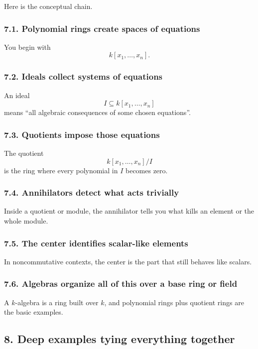 \documentclass[12pt,a4paper]{article}
\theoremstyle{plain}
\theoremstyle{definition}      %
\begin{document}
	Here is the conceptual chain.
	
	\subsubsection*{7.1. Polynomial rings create spaces of equations}
	
	You begin with
	\[
	k[x_1,\dots,x_n].
	\]
	
	\subsubsection*{7.2. Ideals collect systems of equations}
	
	An ideal
	\[
	I\subseteq k[x_1,\dots,x_n]
	\]
	means ``all algebraic consequences of some chosen equations''.
	
	\subsubsection*{7.3. Quotients impose those equations}
	
	The quotient
	\[
	k[x_1,\dots,x_n]/I
	\]
	is the ring where every polynomial in \(I\) becomes zero.
	
	\subsubsection*{7.4. Annihilators detect what acts trivially}
	
	Inside a quotient or module, the annihilator tells you what kills an element or the whole module.
	
	\subsubsection*{7.5. The center identifies scalar-like elements}
	
	In noncommutative contexts, the center is the part that still behaves like scalars.
	
	\subsubsection*{7.6. Algebras organize all of this over a base ring or field}
	
	A \(k\)-algebra is a ring built over \(k\), and polynomial rings plus quotient rings are the basic examples.
	
	\subsection*{8. Deep examples tying everything together}
	
\end{document}
